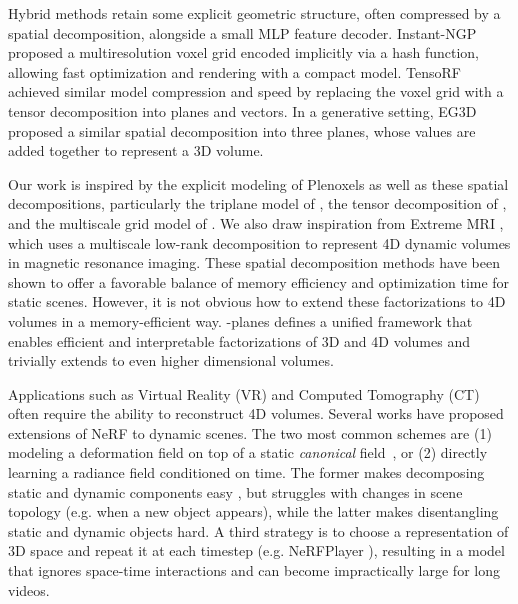 \documentclass[10pt,twocolumn,letterpaper]{article}
\makeatletter
\newcommand{\Modelname}{-planes}
\renewcommand{\paragraph}{\@startsection{paragraph}{4}{\z@}{0.65ex \@plus 1ex \@minus .2ex}{-1em}{\normalfont \normalsize \bfseries }}
\makeatother
\begin{document}
Hybrid methods \cite{dvgo, ingp, tensorf} retain some explicit geometric structure, often compressed by a spatial decomposition, alongside a small MLP feature decoder. Instant-NGP \cite{ingp} proposed a multiresolution voxel grid encoded implicitly via a hash function, allowing fast optimization and rendering with a compact model. TensoRF \cite{tensorf} achieved similar model compression and speed by replacing the voxel grid with a tensor decomposition into planes and vectors. In a generative setting, EG3D \cite{triplane} proposed a similar spatial decomposition into three planes, whose values are added together to represent a 3D volume. 

Our work is inspired by the explicit modeling of Plenoxels as well as these spatial decompositions, particularly the triplane model of \cite{triplane}, the tensor decomposition of \cite{tensorf}, and the multiscale grid model of \cite{ingp}. We also draw inspiration from Extreme MRI \cite{extreme_mri}, which uses a multiscale low-rank decomposition to represent 4D dynamic volumes in magnetic resonance imaging. These spatial decomposition methods have been shown to offer a favorable balance of memory efficiency and optimization time for static scenes. However, it is not obvious how to extend these factorizations to 4D volumes in a memory-efficient way. \Modelname{} defines a unified framework that enables efficient and interpretable factorizations of 3D and 4D volumes and trivially extends to even higher dimensional volumes.


\paragraph{Dynamic volumes.}
Applications such as Virtual Reality (VR) and Computed Tomography (CT) often require the ability to reconstruct 4D volumes. Several works have proposed extensions of NeRF to dynamic scenes. The two most common schemes are (1) modeling a deformation field on top of a static \emph{canonical} field~\cite{dnerf, nrnerf, nerfies, Du4d2021, yuan2021star, tineuvox, nsff}, or (2) directly learning a radiance field conditioned on time\cite{xian2021space, nsff, gao2021, dynerf, hypernerf}. The former makes decomposing static and dynamic components easy \cite{yuan2021star, d2nerf}, but struggles with changes in scene topology (e.g. when a new object appears), while the latter makes disentangling static and dynamic objects hard.
A third strategy is to choose a representation of 3D space and repeat it at each timestep (e.g. NeRFPlayer \cite{nerfplayer}), resulting in a model that ignores space-time interactions and can become impractically large for long videos. 
\end{document}
